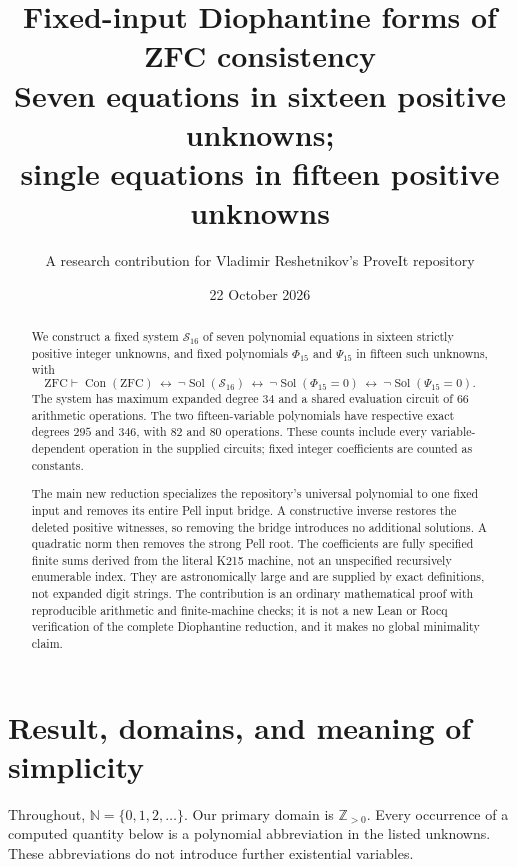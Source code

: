 \documentclass[11pt]{article}
\title{\textbf{Fixed-input Diophantine forms of ZFC consistency}\\[5pt]\large Seven equations in sixteen positive unknowns;\\single equations in fifteen positive unknowns}
\author{A research contribution for Vladimir Reshetnikov's ProveIt repository}
\date{22 October 2026}
\newcommand{\NN}{\mathbb N}
\newcommand{\Pos}{\mathbb Z_{>0}}
\newcommand{\Con}{\operatorname{Con}}
\newcommand{\Sol}{\operatorname{Sol}}
\theoremstyle{remark}\newtheorem{remark}[theorem]{Remark}
\begin{document}
\maketitle
\begin{abstract}
We construct a fixed system $\mathcal S_{16}$ of seven polynomial equations in sixteen strictly positive integer unknowns, and fixed polynomials $\Phi_{15}$ and $\Psi_{15}$ in fifteen such unknowns, with
\[
\mathrm{ZFC}\vdash\Con(\mathrm{ZFC})\ \longleftrightarrow\
\neg\Sol(\mathcal S_{16})\ \longleftrightarrow\
\neg\Sol(\Phi_{15}=0)\ \longleftrightarrow\
\neg\Sol(\Psi_{15}=0).
\]
The system has maximum expanded degree $34$ and a shared evaluation circuit of $66$ arithmetic operations. The two fifteen-variable polynomials have respective exact degrees $295$ and $346$, with $82$ and $80$ operations. These counts include every variable-dependent operation in the supplied circuits; fixed integer coefficients are counted as constants.

The main new reduction specializes the repository's universal polynomial to one fixed input and removes its entire Pell input bridge. A constructive inverse restores the deleted positive witnesses, so removing the bridge introduces no additional solutions. A quadratic norm then removes the strong Pell root. The coefficients are fully specified finite sums derived from the literal K215 machine, not an unspecified recursively enumerable index. They are astronomically large and are supplied by exact definitions, not expanded digit strings. The contribution is an ordinary mathematical proof with reproducible arithmetic and finite-machine checks; it is not a new Lean or Rocq verification of the complete Diophantine reduction, and it makes no global minimality claim.
\end{abstract}
\newpage
\tableofcontents
\newpage

\section{Result, domains, and meaning of simplicity}

Throughout, $\NN=\{0,1,2,\ldots\}$. Our primary domain is $\Pos$. Every occurrence of a computed quantity below is a polynomial abbreviation in the listed unknowns. These abbreviations do not introduce further existential variables.
\end{document}
